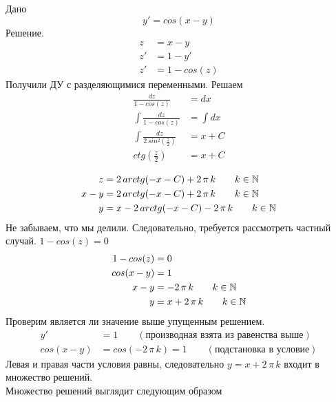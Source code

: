 \begin{Example}
    Дано
    \[
        y' = cos(x - y)
    \]
    Решение.
    \begin{align*}
        z &= x - y\\
        z' &= 1 - y'\\
        z' &= 1 - cos(z) 
    \end{align*}
    Получили ДУ с разделяющимися переменными. Решаем
    \begin{align*}
        \frac{dz}{1- cos(z)} &= dx\\
        \int \frac{dz}{1- cos(z)} &= \int dx\\
        \int \frac{dz}{2\,sin^2\left(\frac{z}{2}\right)} &= x + C\\
        ctg\left(\frac{z}{2}\right) &= x + C\\
    \end{align*} 
    \begin{align*}
        z &= 2\,arctg(-x-C) + 2\,\pi\,k \qquad k \in \mathbb{N}\\
        x - y &= 2\,arctg(-x-C) + 2\,\pi\,k \qquad k \in \mathbb{N}\\
        y &= x - 2\,arctg(-x-C) - 2\,\pi\,k \qquad k \in \mathbb{N}
    \end{align*}
    Не забываем, что мы делили. Следовательно, требуется рассмотреть частный случай. $1 - cos(z) = 0$
    \begin{align*}
        1 - cos(z) &= 0\\
        cos(x - y) &= 1\\
        x - y &= -2\,\pi\,k \qquad k \in \mathbb{N}\\
        y &= x + 2\,\pi\,k \qquad k \in \mathbb{N}
    \end{align*} 
    Проверим является ли значение выше упущенным решением.
    \begin{align*}
        y'& = 1 \qquad (\text{производная взята из равенства выше})\\
        cos(x - y) &= cos(-2\,\pi\,k) = 1 \qquad (\text{подстановка в  условие})
    \end{align*}
    Левая и правая части условия равны, следовательно $y = x + 2\,\pi\,k$ входит в множество решений.\\
     
    Множество решений выглядит следующим образом
    \begin{figure}[h!]
        \noindent{}
    \end{figure}
\end{Example}